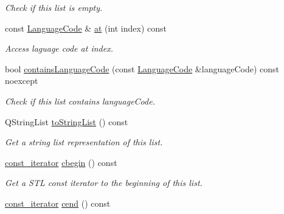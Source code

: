 \begin{DoxyCompactItemize}
\begin{DoxyCompactList}\small\item\em Check if this list is empty. \end{DoxyCompactList}\item 
const \hyperlink{class_mdt_1_1_translation_1_1_language_code}{Language\+Code} \& \hyperlink{class_mdt_1_1_translation_1_1_language_code_list_a86421a283f0a15f555f1ae1b8c35c02a}{at} (int index) const 
\begin{DoxyCompactList}\small\item\em Access laguage code at {\itshape index}. \end{DoxyCompactList}\item 
bool \hyperlink{class_mdt_1_1_translation_1_1_language_code_list_a552cdcc88907db6df669d9de13326347}{contains\+Language\+Code} (const \hyperlink{class_mdt_1_1_translation_1_1_language_code}{Language\+Code} \&language\+Code) const noexcept\hypertarget{class_mdt_1_1_translation_1_1_language_code_list_a552cdcc88907db6df669d9de13326347}{}\label{class_mdt_1_1_translation_1_1_language_code_list_a552cdcc88907db6df669d9de13326347}

\begin{DoxyCompactList}\small\item\em Check if this list contains {\itshape language\+Code}. \end{DoxyCompactList}\item 
Q\+String\+List \hyperlink{class_mdt_1_1_translation_1_1_language_code_list_ad4c8ec0809764e89d23ce19d7cb4360d}{to\+String\+List} () const \hypertarget{class_mdt_1_1_translation_1_1_language_code_list_ad4c8ec0809764e89d23ce19d7cb4360d}{}\label{class_mdt_1_1_translation_1_1_language_code_list_ad4c8ec0809764e89d23ce19d7cb4360d}

\begin{DoxyCompactList}\small\item\em Get a string list representation of this list. \end{DoxyCompactList}\item 
\hyperlink{class_mdt_1_1_translation_1_1_language_code_list_a33a8deeefde68723171be04829356ea5}{const\+\_\+iterator} \hyperlink{class_mdt_1_1_translation_1_1_language_code_list_a6e1fd1678bc249dcad923bfafa5a0d47}{cbegin} () const \hypertarget{class_mdt_1_1_translation_1_1_language_code_list_a6e1fd1678bc249dcad923bfafa5a0d47}{}\label{class_mdt_1_1_translation_1_1_language_code_list_a6e1fd1678bc249dcad923bfafa5a0d47}

\begin{DoxyCompactList}\small\item\em Get a S\+TL const iterator to the beginning of this list. \end{DoxyCompactList}\item 
\hyperlink{class_mdt_1_1_translation_1_1_language_code_list_a33a8deeefde68723171be04829356ea5}{const\+\_\+iterator} \hyperlink{class_mdt_1_1_translation_1_1_language_code_list_a4cc70a7b3d7da854b677be9138bd40fa}{cend} () const \hypertarget{class_mdt_1_1_translation_1_1_language_code_list_a4cc70a7b3d7da854b677be9138bd40fa}{}\label{class_mdt_1_1_translation_1_1_language_code_list_a4cc70a7b3d7da854b677be9138bd40fa}


\end{DoxyCompactItemize}
